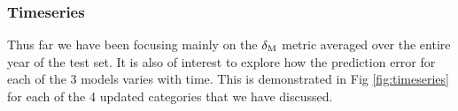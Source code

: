 \documentclass[hess, twostagejnl]{copernicus}
\providecommand{\DIFadd}[1]{{\protect\color{blue}\uwave{#1}}} %
\providecommand{\DIFdel}[1]{{\protect\color{red}\sout{#1}}}                      %
\providecommand{\DIFaddbegin}{} %
\providecommand{\DIFaddend}{} %
\providecommand{\DIFdelbegin}{} %
\providecommand{\DIFdelend}{} %
\begin{document}
	\DIFdelbegin %

\DIFdelend \subsubsection{Timeseries}
\DIFdelbegin %

\DIFdelend Thus far we have been focusing mainly on the \DIFdelbegin \DIFdel{$\delta_{\rm M}$ }\DIFdelend \DIFaddbegin \DIFadd{$\delta_{\rm VM}$ }\DIFaddend metric averaged over the entire year of the test set. It is also of interest to explore how the prediction error for each of the 3 models varies with time. This is demonstrated in Fig \ref{fig:timeseries} for each of the 4 updated categories that we have discussed. \newline 
\end{document}
